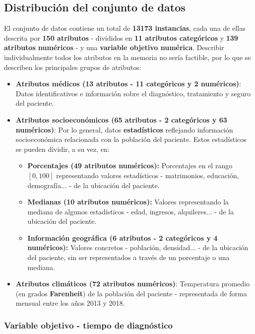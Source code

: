 \subsection{Distribución del conjunto de datos}

El conjunto de datos contiene un total de \textbf{13173 instancias}, cada una de ellas descrita por \textbf{150 atributos} - divididos en \textbf{11 atributos categóricos} y \textbf{139 atributos numéricos} - y una \textbf{variable objetivo numérica}. Describir individualmente todos los atributos en la memoria no sería factible, por lo que se describen los principales grupos de atributos:

\begin{itemize}
	\item \textbf{Atributos médicos (13 atributos - 11 categóricos y 2 numéricos)}: Datos identificativos e información sobre el diagnóstico, tratamiento y seguro del paciente.
	\item \textbf{Atributos socioeconómicos (65 atributos - 2 categóricos y 63 numéricos)}: Por lo general, datos \textbf{estadísticos} reflejando información socioeconómica relacionada con la población del paciente. Estos estadísticos se pueden dividir, a su vez, en:
	\begin{itemize}
		\item \textbf{Porcentajes (49 atributos numéricos):} Porcentajes en el rango $[0, 100]$ representando valores estadísticos - matrimonios, educación, demografía... - de la ubicación del paciente.
		\item \textbf{Medianas (10 atributos numéricos):} Valores representando la mediana de algunos estadísticos - edad, ingresos, alquileres... - de la ubicación del paciente.
		\item \textbf{Información geográfica (6 atributos - 2 categóricos y 4 numéricos):} Valores concretos - población, densidad... - de la ubicación del paciente, sin ser representados a través de un porcentaje o una mediana.
	\end{itemize}
	\item \textbf{Atributos climáticos (72 atributos numéricos)}: Temperatura promedio (en grados \textbf{Farenheit}) de la población del paciente - representada de forma mensual entre los años 2013 y 2018.
\end{itemize}

\subsubsection{Variable objetivo - tiempo de diagnóstico}

